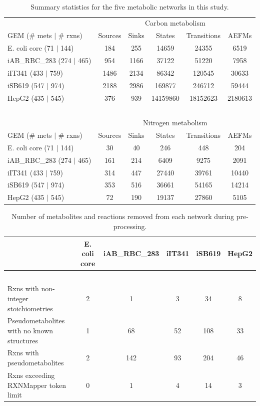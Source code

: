 \documentclass[12pt]{article}
\begin{document}
\begin{table}
\caption{Summary statistics for the five metabolic networks in this study.}
~\\
\begin{tabular}{l|ccccc}
& \multicolumn{5}{c}{{Carbon metabolism}} \\
{GEM (\# mets $|$ \# rxns)} & {Sources} & {Sinks} & {States} & {Transitions} & {AEFMs} \\ \hline
E. coli core (71 $|$ 144) & 184 & 255 & 14659 & 24355 & 6519 \\
iAB\_RBC\_283	 (274 $|$ 465) & 954 & 1166 & 37122 & 51220 & 7958 \\
iIT341 (433 $|$ 759) & 1486 & 2134 & 86342 & 120545 & 30633 \\
iSB619 (547 $|$ 974) & 2188 & 2986 & 169877 & 246712 & 59444 \\
HepG2 (435 $|$ 545) & 376 & 939 & 14159860 & 18152623 & 2180613\\
~\\
& \multicolumn{5}{c}{{Nitrogen metabolism}} \\
{GEM (\# mets $|$ \# rxns)} & {Sources} & {Sinks} & {States} & {Transitions} & {AEFMs} \\ \hline
E. coli core (71 $|$ 144) & 30 & 40 & 246 & 448 & 204 \\
iAB\_RBC\_283	 (274 $|$ 465) & 161 & 214 & 6409 & 9275 & 2091\\
iIT341 (433 $|$ 759) & 314 & 447 & 27440 & 39761 & 10440 \\
iSB619 (547 $|$ 974) & 353 & 516 & 36661 & 54165 & 14214 \\
HepG2 (435 $|$ 545) & 72 & 190 & 19137 & 27860 & 5105 \\
\end{tabular}
\end{table}

\begin{table}
\caption{Number of metabolites and reactions removed from each network during pre-processing.}
\begin{tabular}{l|ccccc}
 & {E. coli core} & {iAB\_RBC\_283} & {iIT341} & {iSB619} & {HepG2} \\ \hline
 ~\vspace{-1ex}\\
{\small Rxns with non-integer stoichiometries} & 2 & 1 & 3 & 34 & 8 \\
{\small Pseudometabolites with no known structures} & 1 & 68 & 52 & 108 & 33 \\
{\small Rxns with pseudometabolites} & 2 & 142 & 93 & 204 & 46 \\
{\small Rxns exceeding RXNMapper token limit} & 0 & 1 & 4 & 14 & 3 
\end{tabular}
\end{table}
\end{document}

